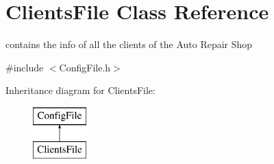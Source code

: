\hypertarget{class_clients_file}{}\section{Clients\+File Class Reference}
\label{class_clients_file}


contains the info of all the clients of the Auto Repair Shop  




{\ttfamily \#include $<$Config\+File.\+h$>$}

Inheritance diagram for Clients\+File\+:\begin{figure}[H]
\begin{center}
\leavevmode
\includegraphics[height=2.000000cm]{class_clients_file}
\end{center}
\end{figure}

